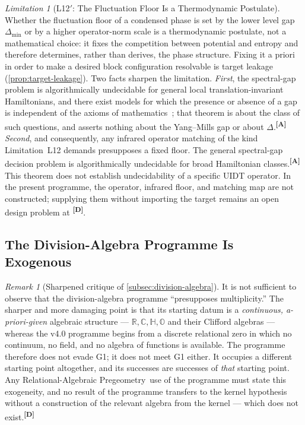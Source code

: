 \documentclass[12pt,a4paper,twoside]{article}
\theoremstyle{plain}
\theoremstyle{definition}
\theoremstyle{remark}
\newtheorem{remark}[theorem]{Remark}
\newtheorem{limitation}[theorem]{Limitation}
\newcommand{\ProjectShort}{Relational-Algebraic Pregeometry}
\newcommand{\RAP}{\ProjectShort}
\newcommand{\catmark}[1]{\textsuperscript{\textsf{\textbf{[#1]}}}}
\begin{document}
\begin{limitation}[L12$'$: The Fluctuation Floor Is a Thermodynamic Postulate]
\label{lim:L12x}
Whether the fluctuation floor of a condensed phase is set by the lower
level gap $\Delta_{\min}$ or by a higher operator-norm scale is a
thermodynamic postulate, not a mathematical choice: it fixes the
competition between potential and entropy and therefore determines,
rather than derives, the phase structure. Fixing it a priori in order to
make a desired block configuration resolvable is target leakage
(\cref{prop:target-leakage}). Two facts sharpen the limitation.
\emph{First}, the spectral-gap problem is algorithmically undecidable for
general local translation-invariant Hamiltonians, and there exist models
for which the presence or absence of a gap is independent of the axioms
of mathematics~\cite{cubitt2015}; that theorem is about the class of such
questions, and asserts nothing about the Yang--Mills gap or about
$\Delta$.\catmark{A} \emph{Second}, and consequently, any infrared
operator matching of the kind Limitation~L12 demands presupposes a fixed
floor. The general spectral-gap decision problem is algorithmically undecidable
for broad Hamiltonian classes.\catmark{A} This theorem does not establish
undecidability of a specific UIDT operator. In the present programme, the
operator, infrared floor, and matching map are not constructed; supplying
them without importing the target remains an open design problem at
\catmark{D}.
\end{limitation}

\subsection{The Division-Algebra Programme Is Exogenous}
\label{subsec:division-exogeneity}

\begin{remark}[Sharpened critique of \cref{subsec:division-algebra}]
\label{rem:division-exogeneity}
It is not sufficient to observe that the division-algebra programme
``presupposes multiplicity.'' The sharper and more damaging point is
that its starting datum is a \emph{continuous, a-priori-given} algebraic
structure --- $\mathbb R, \mathbb C, \mathbb H, \mathbb O$ and their
Clifford algebras --- whereas the v4.0 programme begins from a discrete
relational zero in which no continuum, no field, and no algebra of
functions is available. The programme therefore does not evade G1; it
does not meet G1 either. It occupies a different starting point
altogether, and its successes are successes of \emph{that} starting
point. Any \RAP\ use of the programme must state this exogeneity, and no
result of the programme transfers to the kernel hypothesis without a
construction of the relevant algebra from the kernel --- which does not
exist.\catmark{D}
\end{remark}
\end{document}
